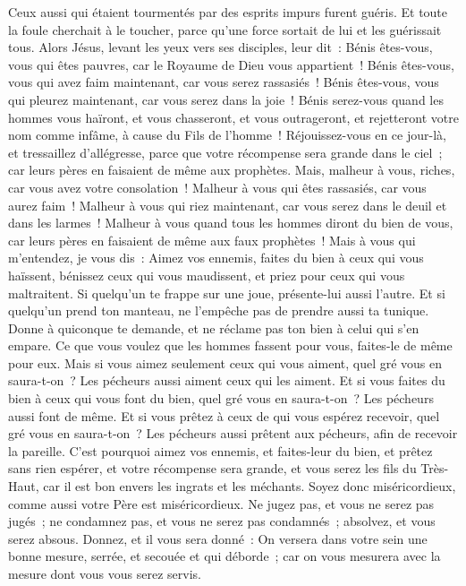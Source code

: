 \begin{multicols}{2}
Ceux aussi qui étaient tourmentés par des esprits impurs furent guéris.
Et toute la foule cherchait à le toucher, parce qu'une force sortait de lui et les guérissait tous.
Alors Jésus, levant les yeux vers ses disciples, leur dit~: Bénis êtes-vous, vous qui êtes pauvres, car le Royaume de Dieu vous appartient~!
Bénis êtes-vous, vous qui avez faim maintenant, car vous serez rassasiés~! Bénis êtes-vous, vous qui pleurez maintenant, car vous serez dans la joie~!
Bénis serez-vous quand les hommes vous haïront, et vous chasseront, et vous outrageront, et rejetteront votre nom comme infâme, à cause du Fils de l'homme~!
Réjouissez-vous en ce jour-là, et tressaillez d'allégresse, parce que votre récompense sera grande dans le ciel~; car leurs pères en faisaient de même aux prophètes.
Mais, malheur à vous, riches, car vous avez votre consolation~!
Malheur à vous qui êtes rassasiés, car vous aurez faim~! Malheur à vous qui riez maintenant, car vous serez dans le deuil et dans les larmes~!
Malheur à vous quand tous les hommes diront du bien de vous, car leurs pères en faisaient de même aux faux prophètes~!
Mais à vous qui m'entendez, je vous dis~: Aimez vos ennemis, faites du bien à ceux qui vous haïssent,
bénissez ceux qui vous maudissent, et priez pour ceux qui vous maltraitent.
Si quelqu'un te frappe sur une joue, présente-lui aussi l'autre. Et si quelqu'un prend ton manteau, ne l'empêche pas de prendre aussi ta tunique.
Donne à quiconque te demande, et ne réclame pas ton bien à celui qui s'en empare.
Ce que vous voulez que les hommes fassent pour vous, faites-le de même pour eux.
Mais si vous aimez seulement ceux qui vous aiment, quel gré vous en saura-t-on~? Les pécheurs aussi aiment ceux qui les aiment.
Et si vous faites du bien à ceux qui vous font du bien, quel gré vous en saura-t-on~? Les pécheurs aussi font de même.
Et si vous prêtez à ceux de qui vous espérez recevoir, quel gré vous en saura-t-on~? Les pécheurs aussi prêtent aux pécheurs, afin de recevoir la pareille.
C'est pourquoi aimez vos ennemis, et faites-leur du bien, et prêtez sans rien espérer, et votre récompense sera grande, et vous serez les fils du Très-Haut, car il est bon envers les ingrats et les méchants.
Soyez donc miséricordieux, comme aussi votre Père est miséricordieux.
Ne jugez pas, et vous ne serez pas jugés~; ne condamnez pas, et vous ne serez pas condamnés~; absolvez, et vous serez absous.
Donnez, et il vous sera donné~: On versera dans votre sein une bonne mesure, serrée, et secouée et qui déborde~; car on vous mesurera avec la mesure dont vous vous serez servis.

\end{multicols}
